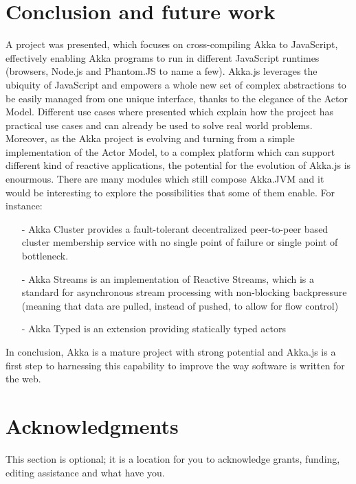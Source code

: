 \documentclass{sig-alternate}
\begin{document}
\section{Conclusion and future work}\label{sec:conclusion}

A project was presented, which focuses on cross-compiling Akka to JavaScript, effectively enabling Akka programs to run in different 
JavaScript runtimes (browsers, Node.js and Phantom.JS to name a few).
Akka.js leverages the ubiquity of JavaScript and empowers a whole new set of complex abstractions to be easily managed from one
unique interface, thanks to the elegance of the Actor Model. Different use cases where presented which explain how the project
has practical use cases and can already be used to solve real world problems.
Moreover, as the Akka project is evolving and turning from a simple implementation of the Actor Model, to a complex platform
which can support different kind of reactive applications, the potential for the evolution of Akka.js is enourmous.
There are many modules which still compose Akka.JVM and it would be interesting to explore the possibilities that some of them
enable. For instance:
\begin{itemize}
\item[-] Akka Cluster provides a fault-tolerant decentralized peer-to-peer based cluster membership service with no single point of failure or single point of bottleneck.
\item[-] Akka Streams is an implementation of Reactive Streams, which is a standard for asynchronous stream processing with non-blocking backpressure (meaning that data 
are pulled, instead of pushed, to allow for flow control)
\item[-] Akka Typed is an extension providing statically typed actors
\end{itemize}
In conclusion, Akka is a mature project with strong potential and Akka.js is a first step to harnessing this capability to 
improve the way software is written for the web.


\section{Acknowledgments}
This section is optional; it is a location for you
to acknowledge grants, funding, editing assistance and
what have you.

%

%
%

\end{document}
